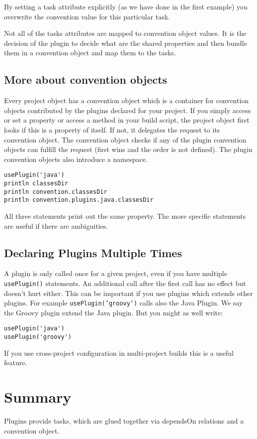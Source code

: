 By setting a task attribute explicitly (as we have done in the first example) you overwrite the convention value for this particular task.

Not all of the tasks attributes are mapped to convention object values. It is the decision of the plugin to decide what are the shared properties and then bundle them in a convention object and map them to the tasks.

\subsection{More about convention objects} %
\label{sub:more_about_convention_objects}
Every project object has a convention object which is a container for convention objects contributed by the plugins declared for your project. If you simply access or set a property or access a method in your build script, the project object first looks if this is a property of itself. If not, it delegates the request to its convention object. The convention object checks if any of the plugin convention objects can fulfill the request (first wins and the order is not defined). The plugin convention objects also introduce a namespace.   
\begin{Verbatim}
usePlugin('java')
println classesDir
println convention.classesDir
println convention.plugins.java.classesDir
\end{Verbatim}   
All three statements print out the same property. The more specific statements are useful if there are ambiguities.  

\subsection{Declaring Plugins Multiple Times} %
\label{sub:declaring_plugins_multiple_times}
A plugin is only called once for a given project, even if you have multiple \texttt{usePlugin()} statements. An additional call after the first call has no effect but doesn't hurt either. This can be important if you use plugins which extends other plugins. For example \texttt{usePlugin('groovy')} calls also the Java Plugin. We say the Groovy plugin extend the Java plugin. But you might as well write:
\begin{Verbatim}
usePlugin('java')
usePlugin('groovy')
\end{Verbatim}
If you use cross-project configuration in multi-project builds this is a useful feature.

\section{Summary} %
\label{sec:summary}
Plugins provide tasks, which are glued together via dependsOn relations and a convention object. 
